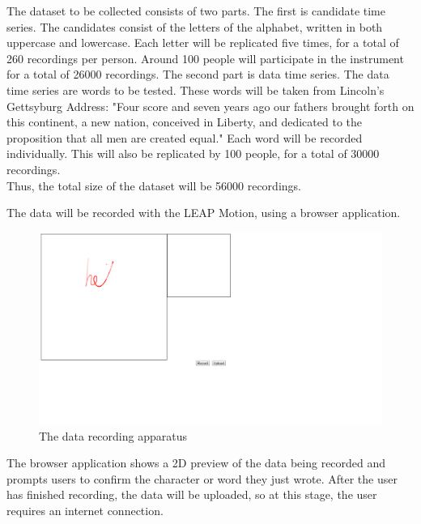The dataset to be collected consists of two parts.
The first is candidate time series. The candidates consist of the letters of the alphabet, written in both uppercase and lowercase. Each letter will be replicated five times, for a total of 260 recordings per person. Around 100 people will participate in the instrument for a total of 26000 recordings.
The second part is data time series. The data time series are words to be tested. These words will be taken from Lincoln's Gettsyburg Address: "Four score and seven years ago our fathers brought forth on this continent, a new nation, conceived in Liberty, and dedicated to the proposition that all men are created equal." Each word will be recorded individually. This will also be replicated by 100 people, for a total of 30000 recordings.
\\[1\baselineskip]
Thus, the total size of the dataset will be 56000 recordings.

The data will be recorded with the LEAP Motion, using a browser application. \\
\begin{figure}
  \begin{center}
  \includegraphics[width=\columnwidth]{images/recording-1.PNG}
  \caption{The data recording apparatus}
  \label{fig:teaser}
  \end{center}  
\end{figure}
The browser application shows a 2D preview of the data being recorded and prompts users to confirm the character or word they just wrote.
After the user has finished recording, the data will be uploaded, so at this stage, the user requires an internet connection.

